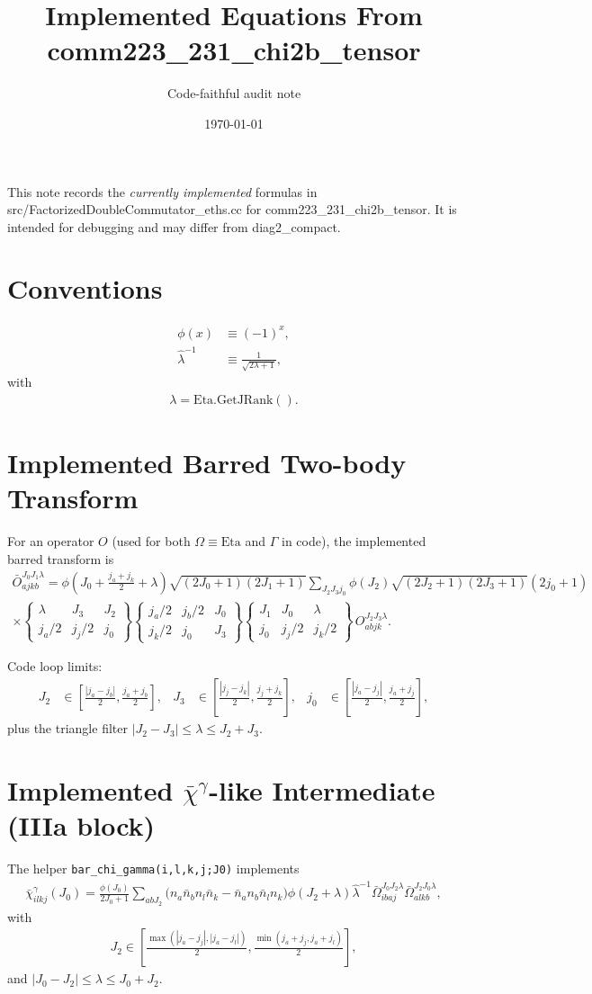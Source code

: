 \documentclass{article}
\title{Implemented Equations From comm223\_231\_chi2b\_tensor}
\author{Code-faithful audit note}
\date{\today}
\newcommand{\sixj}[6]{\left\{\begin{matrix}#1&#2&#3\\#4&#5&#6\end{matrix}\right\}}
\begin{document}
\maketitle

This note records the \emph{currently implemented} formulas in
src/FactorizedDoubleCommutator\_eths.cc for
comm223\_231\_chi2b\_tensor.
It is intended for debugging and may differ from diag2\_compact.

\section*{Conventions}
\begin{align}
\phi(x) &\equiv (-1)^x, \\
\hat\lambda^{-1} &\equiv \frac{1}{\sqrt{2\lambda+1}},
\end{align}
with
\begin{align}
\lambda = \mathrm{Eta.GetJRank()}.
\end{align}

\section*{Implemented Barred Two-body Transform}
For an operator $O$ (used for both $\Omega\equiv\mathrm{Eta}$ and
$\Gamma$ in code), the implemented barred transform is
\begin{align}
\bar O_{ajkb}^{J_0J_1\lambda}
=
\phi\!\left(J_0+\frac{j_a+j_k}{2}+\lambda\right)
\sqrt{(2J_0+1)(2J_1+1)}
\sum_{J_2J_3j_0}
\phi(J_2)
\sqrt{(2J_2+1)(2J_3+1)}(2j_0+1)
\\
\times
\sixj{\lambda}{J_3}{J_2}{j_a/2}{j_j/2}{j_0}
\sixj{j_a/2}{j_b/2}{J_0}{j_k/2}{j_0}{J_3}
\sixj{J_1}{J_0}{\lambda}{j_0}{j_j/2}{j_k/2}
\,O_{abjk}^{J_2J_3\lambda}.
\end{align}

Code loop limits:
\begin{align}
J_2 &\in \left[\frac{|j_a-j_b|}{2},\frac{j_a+j_b}{2}\right],
&
J_3 &\in \left[\frac{|j_j-j_k|}{2},\frac{j_j+j_k}{2}\right],
&
j_0 &\in \left[\frac{|j_a-j_j|}{2},\frac{j_a+j_j}{2}\right],
\end{align}
plus the triangle filter $|J_2-J_3|\le\lambda\le J_2+J_3$.

\section*{Implemented $\bar\chi^{\gamma}$-like Intermediate (IIIa block)}
The helper \texttt{bar\_chi\_gamma(i,l,k,j;J0)} implements
\begin{align}
\bar\chi^{\gamma}_{ilkj}(J_0)
=
\frac{\phi(J_0)}{2J_0+1}
\sum_{abJ_2}
\Big(n_a\bar n_b n_l\bar n_k - \bar n_a n_b\bar n_l n_k\Big)
\phi(J_2+\lambda)
\hat\lambda^{-1}
\bar\Omega_{ibaj}^{J_0J_2\lambda}
\bar\Omega_{alkb}^{J_2J_0\lambda},
\end{align}
with
\begin{align}
J_2\in
\left[
\frac{\max(|j_a-j_j|,|j_a-j_l|)}{2},
\frac{\min(j_a+j_j,j_a+j_l)}{2}
\right],
\end{align}
and $|J_0-J_2|\le\lambda\le J_0+J_2$.
\end{document}
